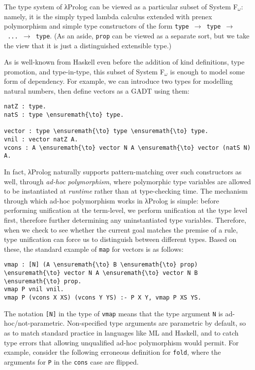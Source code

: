 The type system of \foreignlanguage{greek}{λ}Prolog can be viewed as a particular subset of
System F\(_\omega\): namely, it is the simply typed lambda calculus
extended with prenex polymorphism and simple type constructors of the
form
\texttt{type\ \ensuremath{\to}\ type\ \ensuremath{\to}\ ...\ \ensuremath{\to}\ type}.
(As an aside, \texttt{prop} can be viewed as a separate sort, but we
take the view that it is just a distinguished extensible type.)

As is well-known from Haskell even before the addition of kind
definitions, type promotion, and type-in-type, this subset of System
F\(_\omega\) is enough to model some form of dependency. For example, we
can introduce two types for modelling natural numbers, then define
vectors as a GADT using them:

\begin{verbatim}
natZ : type.
natS : type \ensuremath{\to} type.

vector : type \ensuremath{\to} type \ensuremath{\to} type.
vnil : vector natZ A.
vcons : A \ensuremath{\to} vector N A \ensuremath{\to} vector (natS N) A.
\end{verbatim}

In fact, \foreignlanguage{greek}{λ}Prolog naturally supports pattern-matching over such
constructors as well, through \emph{ad-hoc polymorphism}, where
polymorphic type variables are allowed to be instantiated at
\emph{runtime} rather than at type-checking time. The mechanism through
which ad-hoc polymorphism works in \foreignlanguage{greek}{λ}Prolog is simple: before performing
unification at the term-level, we perform unification at the type level
first, therefore further determining any uninstantiated type variables.
Therefore, when we check to see whether the current goal matches the
premise of a rule, type unification can force us to distinguish between
different types. Based on these, the standard example of \texttt{map}
for vectors is as follows:

\begin{verbatim}
vmap : [N] (A \ensuremath{\to} B \ensuremath{\to} prop) \ensuremath{\to} vector N A \ensuremath{\to} vector N B \ensuremath{\to} prop.
vmap P vnil vnil.
vmap P (vcons X XS) (vcons Y YS) :- P X Y, vmap P XS YS.
\end{verbatim}

The notation \texttt{{[}N{]}} in the type of \texttt{vmap} means that
the type argument \texttt{N} is ad-hoc/not-parametric. Non-specified
type arguments are parametric by default, so as to match standard
practice in languages like ML and Haskell, and to catch type errors that
allowing unqualified ad-hoc polymorphism would permit. For example,
consider the following erroneous definition for \texttt{fold}, where the
arguments for \texttt{P} in the \texttt{cons} case are flipped.

